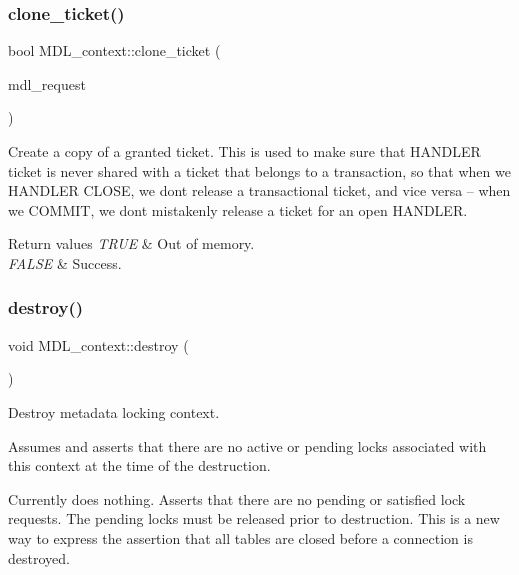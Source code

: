 \subsubsection{\texorpdfstring{clone\+\_\+ticket()}{clone\_ticket()}}
{\footnotesize\ttfamily bool M\+D\+L\+\_\+context\+::clone\+\_\+ticket (\begin{DoxyParamCaption}\item[{\mbox{\hyperlink{classMDL__request}{M\+D\+L\+\_\+request}} $\ast$}]{mdl\+\_\+request }\end{DoxyParamCaption})}

Create a copy of a granted ticket. This is used to make sure that H\+A\+N\+D\+L\+ER ticket is never shared with a ticket that belongs to a transaction, so that when we H\+A\+N\+D\+L\+ER C\+L\+O\+SE, we don\textquotesingle{}t release a transactional ticket, and vice versa -- when we C\+O\+M\+M\+IT, we don\textquotesingle{}t mistakenly release a ticket for an open H\+A\+N\+D\+L\+ER.


\begin{DoxyRetVals}{Return values}
{\em T\+R\+UE} & Out of memory. \\
\hline
{\em F\+A\+L\+SE} & Success. \\
\hline
\end{DoxyRetVals}
\mbox{\label{classMDL__context_af01a1f42bd9ed050556c434fb6d007ac}} 
\subsubsection{\texorpdfstring{destroy()}{destroy()}}
{\footnotesize\ttfamily void M\+D\+L\+\_\+context\+::destroy (\begin{DoxyParamCaption}\item[{void}]{ }\end{DoxyParamCaption})}

Destroy metadata locking context.

Assumes and asserts that there are no active or pending locks associated with this context at the time of the destruction.

Currently does nothing. Asserts that there are no pending or satisfied lock requests. The pending locks must be released prior to destruction. This is a new way to express the assertion that all tables are closed before a connection is destroyed. \mbox{\label{classMDL__context_ad5d3fb033110d449d894c95f33f6d9b1}} 
